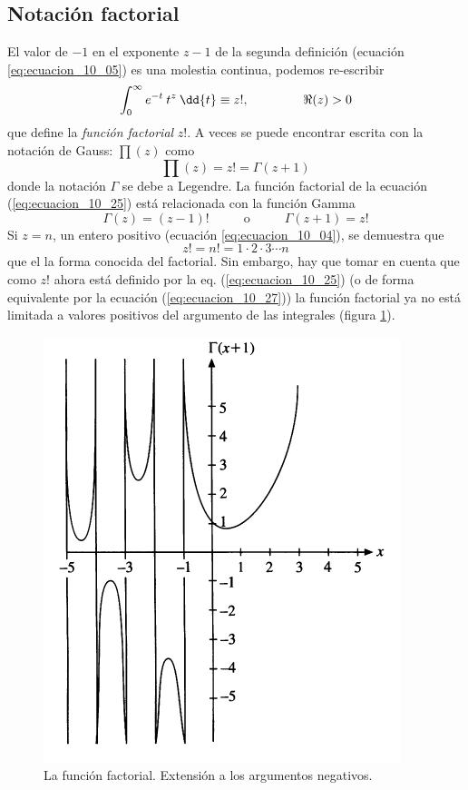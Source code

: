\subsection{Notación factorial}
El valor de $-1$ en el exponente $z-1$ de la segunda definición (ecuación \ref{eq:ecuacion_10_05}) es una molestia continua, podemos re-escribir
\begin{equation}
\int_{0}^{\infty} e^{-t} \: t^{z} \: \dd{t} \equiv z!,  \hspace{1.5cm} \Re (z) > 0
\label{eq:ecuacion_10_25}
\end{equation}
que define la \emph{función factorial} $z!$. A veces se puede encontrar escrita con la notación de Gauss: $\prod (z)$ como
\begin{equation}
\prod(z) = z! = \Gamma (z + 1)
\label{eq:ecuacion_10_26}
\end{equation}
donde la notación $\Gamma$ se debe a Legendre. La función factorial de la ecuación (\ref{eq:ecuacion_10_25}) está relacionada con la función Gamma
\begin{equation}
\Gamma (z) = (z-1)! \hspace{1cm} \mbox{ o } \hspace{1cm} \Gamma (z + 1) = z!
\label{eq:ecuacion_10_27}
\end{equation}
Si $z = n$, un entero positivo (ecuación \ref{eq:ecuacion_10_04}), se demuestra que
\begin{equation}
z! = n! = 1 \cdot 2 \cdot 3 \cdots n
\label{eq:ecuacion_10_28}
\end{equation}
que el la forma conocida del factorial. Sin embargo, hay que tomar en cuenta que como $z!$ ahora está definido por la eq. (\ref{eq:ecuacion_10_25}) (o de forma equivalente por la ecuación (\ref{eq:ecuacion_10_27})) la función factorial ya no está limitada a valores positivos del argumento de las integrales (figura \ref{fig:figura_10_01}).
\begin{figure}[H]
    \centering
    \includegraphics[scale=0.6]{Imagenes/FuncionFactorial_01.png}
    \caption{La función factorial. Extensión a los argumentos negativos.}
    \label{fig:figura_10_01}
\end{figure}
